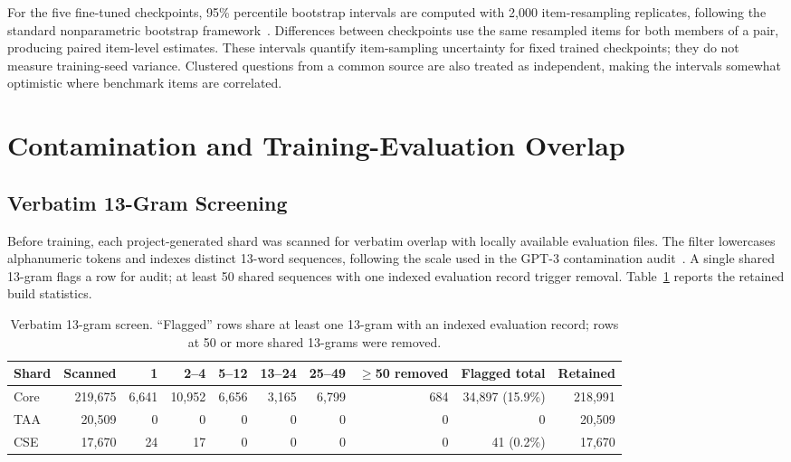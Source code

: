 \documentclass[conference]{IEEEtran}
\begin{document}
For the five fine-tuned checkpoints, 95\% percentile bootstrap intervals are computed with 2,000 item-resampling replicates, following the standard nonparametric bootstrap framework~\cite{efron1993bootstrap}. Differences between checkpoints use the same resampled items for both members of a pair, producing paired item-level estimates. These intervals quantify item-sampling uncertainty for fixed trained checkpoints; they do not measure training-seed variance. Clustered questions from a common source are also treated as independent, making the intervals somewhat optimistic where benchmark items are correlated.

\section{Contamination and Training-Evaluation Overlap}
\subsection{Verbatim 13-Gram Screening}
Before training, each project-generated shard was scanned for verbatim overlap with locally available evaluation files. The filter lowercases alphanumeric tokens and indexes distinct 13-word sequences, following the scale used in the GPT-3 contamination audit~\cite{brown2020language}. A single shared 13-gram flags a row for audit; at least 50 shared sequences with one indexed evaluation record trigger removal. Table~\ref{tab:contam} reports the retained build statistics.

\begin{table}[t]
\caption{Verbatim 13-gram screen. ``Flagged'' rows share at least one 13-gram with an indexed evaluation record; rows at 50 or more shared 13-grams were removed.}
\label{tab:contam}
\centering
\scriptsize
\setlength{\tabcolsep}{3.0pt}
\begin{tabular}{@{}lrrrrrrrrr@{}}
\toprule
Shard & Scanned & 1 & 2--4 & 5--12 & 13--24 & 25--49 & $\geq$50 removed & Flagged total & Retained \\
\midrule
Core & 219,675 & 6,641 & 10,952 & 6,656 & 3,165 & 6,799 & 684 & 34,897 (15.9\%) & 218,991 \\
TAA & 20,509 & 0 & 0 & 0 & 0 & 0 & 0 & 0 & 20,509 \\
CSE & 17,670 & 24 & 17 & 0 & 0 & 0 & 0 & 41 (0.2\%) & 17,670 \\
\bottomrule
\end{tabular}
\end{table}
\end{document}
